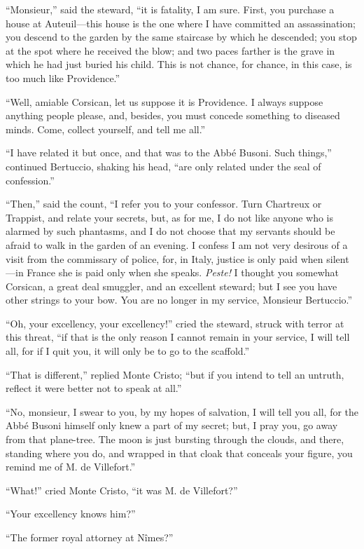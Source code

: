 “Monsieur,” said the steward, “it is fatality, I am sure. First, you
purchase a house at Auteuil—this house is the one where I have
committed an assassination; you descend to the garden by the same
staircase by which he descended; you stop at the spot where he received
the blow; and two paces farther is the grave in which he had just
buried his child. This is not chance, for chance, in this case, is too
much like Providence.”

“Well, amiable Corsican, let us suppose it is Providence. I always
suppose anything people please, and, besides, you must concede
something to diseased minds. Come, collect yourself, and tell me all.”

“I have related it but once, and that was to the Abbé Busoni. Such
things,” continued Bertuccio, shaking his head, “are only related under
the seal of confession.”

“Then,” said the count, “I refer you to your confessor. Turn Chartreux
or Trappist, and relate your secrets, but, as for me, I do not like
anyone who is alarmed by such phantasms, and I do not choose that my
servants should be afraid to walk in the garden of an evening. I
confess I am not very desirous of a visit from the commissary of
police, for, in Italy, justice is only paid when silent—in France she
is paid only when she speaks. \textit{Peste!} I thought you somewhat Corsican,
a great deal smuggler, and an excellent steward; but I see you have
other strings to your bow. You are no longer in my service, Monsieur
Bertuccio.”

“Oh, your excellency, your excellency!” cried the steward, struck with
terror at this threat, “if that is the only reason I cannot remain in
your service, I will tell all, for if I quit you, it will only be to go
to the scaffold.”

“That is different,” replied Monte Cristo; “but if you intend to tell
an untruth, reflect it were better not to speak at all.”

“No, monsieur, I swear to you, by my hopes of salvation, I will tell
you all, for the Abbé Busoni himself only knew a part of my secret;
but, I pray you, go away from that plane-tree. The moon is just
bursting through the clouds, and there, standing where you do, and
wrapped in that cloak that conceals your figure, you remind me of M. de
Villefort.”

“What!” cried Monte Cristo, “it was M. de Villefort?”

“Your excellency knows him?”

“The former royal attorney at Nîmes?”

